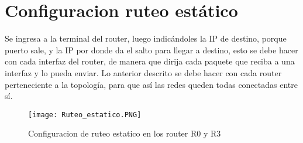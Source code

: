 \documentclass{udpreport}
\begin{document}
	\section{Configuracion ruteo estático}
	Se ingresa a la terminal del router, luego indicándoles la IP de destino, porque puerto sale, y la IP por donde da el salto
	para llegar a destino, esto se debe hacer con cada interfaz del router, de manera que dirija cada paquete que reciba a una
	interfaz y lo pueda enviar. Lo anterior descrito se debe hacer con cada router perteneciente a la topología, para que así las
	redes queden todas conectadas entre sí.\\
	\begin{figure}[H]
	\centering
	\texttt{[image: Ruteo\_estatico.PNG]}
	\caption{Configuracion de ruteo estatico en los router R0 y R3}
	\end{figure}\\
\end{document}
